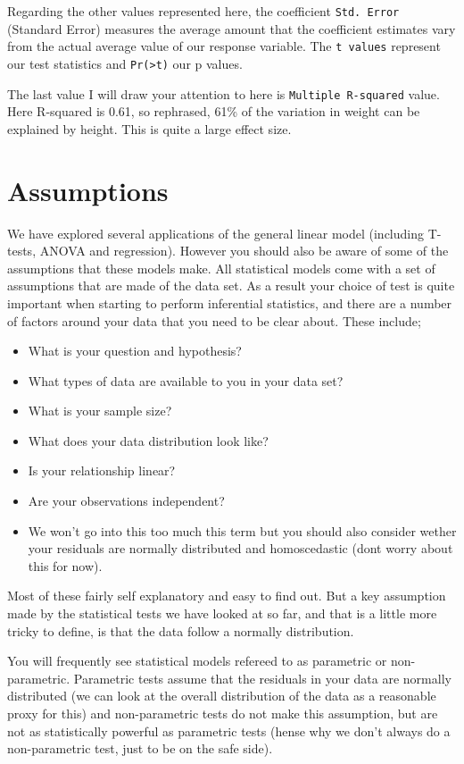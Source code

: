 \documentclass[
]{book}
\providecommand{\tightlist}{%
  \setlength{\itemsep}{0pt}\setlength{\parskip}{0pt}}
\begin{document}
Regarding the other values represented here, the coefficient \texttt{Std.\ Error} (Standard Error) measures the average amount that the coefficient estimates vary from the actual average value of our response variable. The \texttt{t\ values} represent our test statistics and \texttt{Pr(\textgreater{}\textbar{}t\textbar{})} our p values.

The last value I will draw your attention to here is \texttt{Multiple\ R-squared} value. Here R-squared is 0.61, so rephrased, 61\% of the variation in weight can be explained by height. This is quite a large effect size.

\section{Assumptions}\label{assumptions}

We have explored several applications of the general linear model (including T-tests, ANOVA and regression). However you should also be aware of some of the assumptions that these models make. All statistical models come with a set of assumptions that are made of the data set. As a result your choice of test is quite important when starting to perform inferential statistics, and there are a number of factors around your data that you need to be clear about. These include;

\begin{itemize}
\tightlist
\item
  What is your question and hypothesis?
\item
  What types of data are available to you in your data set?
\item
  What is your sample size?
\item
  What does your data distribution look like?
\item
  Is your relationship linear?
\item
  Are your observations independent?
\item
  We won't go into this too much this term but you should also consider wether your residuals are normally distributed and homoscedastic (dont worry about this for now).
\end{itemize}

Most of these fairly self explanatory and easy to find out. But a key assumption made by the statistical tests we have looked at so far, and that is a little more tricky to define, is that the data follow a normally distribution.

You will frequently see statistical models refereed to as parametric or non-parametric. Parametric tests assume that the residuals in your data are normally distributed (we can look at the overall distribution of the data as a reasonable proxy for this) and non-parametric tests do not make this assumption, but are not as statistically powerful as parametric tests (hense why we don't always do a non-parametric test, just to be on the safe side).
\end{document}
